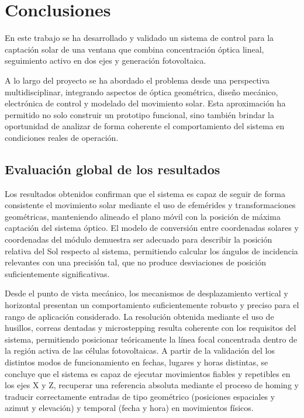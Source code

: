 \chapter{Conclusiones}

En este trabajo se ha desarrollado y validado un sistema de control para la captación solar de una ventana que combina concentración óptica lineal, seguimiento activo en dos ejes y generación fotovoltaica.

A lo largo del proyecto se ha abordado el problema desde una perspectiva multidisciplinar, integrando aspectos de óptica geométrica, diseño mecánico, electrónica de control y modelado del movimiento solar. Esta aproximación ha permitido no solo construir un prototipo funcional, sino también brindar la oportunidad de analizar de forma coherente el comportamiento del sistema en condiciones reales de operación.

\section{Evaluación global de los resultados}

Los resultados obtenidos confirman que el sistema es capaz de seguir de forma consistente el movimiento solar mediante el uso de efemérides y transformaciones geométricas, manteniendo alineado el plano móvil con la posición de máxima captación del sistema óptico. El modelo de conversión entre coordenadas solares y coordenadas del módulo demuestra ser adecuado para describir la posición relativa del Sol respecto al sistema, permitiendo calcular los ángulos de incidencia relevantes con una precisión tal, que no produce desviaciones de posición suficientemente significativas.

Desde el punto de vista mecánico, los mecanismos de desplazamiento vertical y horizontal presentan un comportamiento suficientemente robusto y preciso para el rango de aplicación considerado. La resolución obtenida mediante el uso de husillos, correas dentadas y microstepping resulta coherente con los requisitos del sistema, permitiendo posicionar teóricamente la línea focal concentrada dentro de la región activa de las células fotovoltaicas. A partir de la validación del los distintos modos de funcionamiento en fechas, lugares y horas distintas, se concluye que el sistema es capaz de ejecutar movimientos fiables y repetibles en los ejes X y Z, recuperar una referencia absoluta mediante el proceso de homing y traducir correctamente entradas de tipo geométrico (posiciones espaciales y azimut y elevación) y temporal (fecha y hora) en movimientos físicos.

